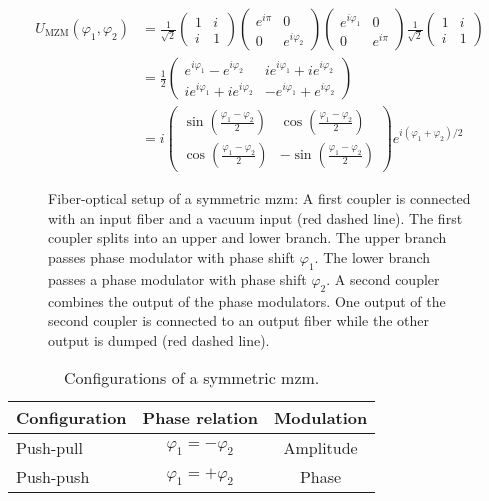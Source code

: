 \begin{equation}
	\begin{split}
		U_\text{MZM}(\varphi_1,\varphi_2)
		&=
		\frac{1}{\sqrt{2}}
		\begin{pmatrix}
			1 & i \\
			i & 1
		\end{pmatrix}
		\begin{pmatrix}
			e^{i\pi} & 0 \\
			0 & e^{i\varphi_2}
		\end{pmatrix}
		\begin{pmatrix}
			e^{i\varphi_1} & 0 \\
			0 & e^{i\pi}
		\end{pmatrix}
		\frac{1}{\sqrt{2}}
		\begin{pmatrix}
			1 & i \\
			i & 1
		\end{pmatrix}
		\\
		&=
		\frac{1}{2}
		\begin{pmatrix}
			e^{i\varphi_1}-e^{i\varphi_2} & ie^{i\varphi_1}+ie^{i\varphi_2} \\
			ie^{i\varphi_1}+ie^{i\varphi_2} & -e^{i\varphi_1}+e^{i\varphi_2}
		\end{pmatrix}
		\\
		&=
		i
		\begin{pmatrix}
			\sin(\frac{\varphi_1-\varphi_2}{2}) & \cos(\frac{\varphi_1-\varphi_2}{2}) \\
			\cos(\frac{\varphi_1-\varphi_2}{2}) & -\sin(\frac{\varphi_1-\varphi_2}{2})
		\end{pmatrix}
		e^{i(\varphi_1+\varphi_2)/2}
	\end{split}
\end{equation}

\begin{figure}[htb]
	\centering
	
	\caption{Fiber-optical setup of a symmetric \gls{mzm}: A first coupler is connected with an input fiber and a vacuum input (red dashed line). The first coupler splits into an upper and lower branch. The upper branch passes phase modulator with phase shift $\varphi_1$. The lower branch passes a phase modulator with phase shift $\varphi_2$. A second coupler combines the output of the phase modulators. One output of the second coupler is connected to an output fiber while the other output is dumped (red dashed line).}
\end{figure}

\begin{table}[htb]
	\centering
	\begin{tabular}{lcc}
		\toprule
		Configuration & Phase relation & Modulation \\
		\midrule
		Push-pull & $\varphi_1=-\varphi_2$ & Amplitude \\
		Push-push & $\varphi_1=+\varphi_2$ & Phase \\
		\bottomrule
	\end{tabular}
	\caption{Configurations of a symmetric \gls{mzm}.}
\end{table}

